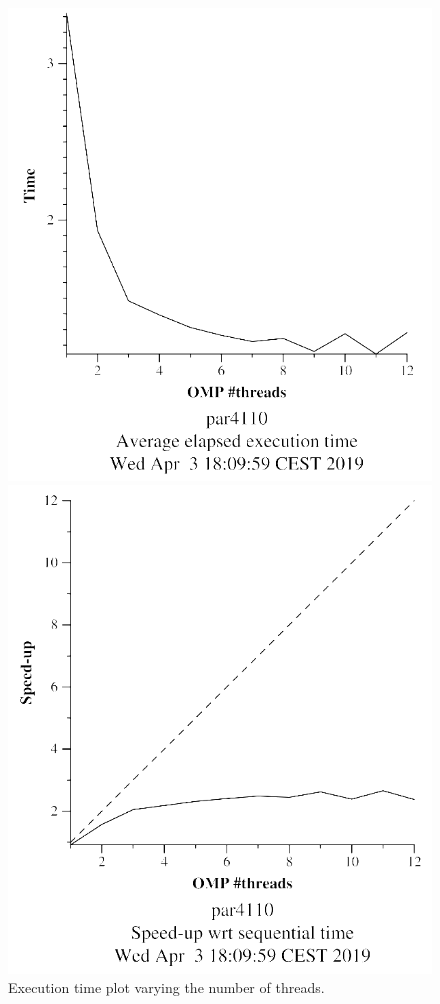 \documentclass[12pt, a4paper]{article}
\begin{document}
\begin{figure}[H]
\centering
\begin{minipage}[b]{0.4\linewidth}
  \centering
  \includegraphics[scale=0.5]{./mandel-omp-10000-strong-21-time}
  \caption{Execution time plot varying the number of threads.}
  \label{fig:mandel-omp-10000-strong-21-time}
\end{minipage}%
\hspace{0.5cm}
\begin{minipage}[b]{0.4\linewidth}
  \centering
  \includegraphics[scale=0.5]{./mandel-omp-10000-strong-21-speedup}

\end{minipage}
\end{figure}
\end{document}
